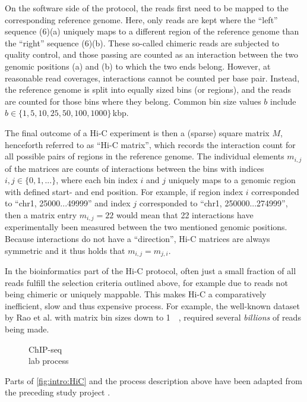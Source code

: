 On the software side of the protocol, the reads first need to be mapped 
to the corresponding reference genome.
Here, only reads are kept where the ``left'' sequence (6)(a)
uniquely maps to a different region of the reference genome than the ``right'' sequence (6)(b).
These so-called chimeric reads are subjected to quality control, and those passing are counted as an interaction
between the two genomic positions (a) and (b) to which the two ends belong.
However, at reasonable read coverages, interactions cannot be counted per base pair. 
Instead, the reference genome is split into equally sized bins (or regions), 
and the reads are counted for those bins where they belong. 
Common bin size values $b$ include $b \in \{1, 5, 10, 25, 50, 100, 1000\}$\,kbp.

The final outcome of a Hi-C experiment is then a (sparse) square matrix $M$, henceforth referred to as ``Hi-C matrix'', 
which records the interaction count for all possible pairs of regions in the reference genome.
The individual elements $m_{i,j}$ of the matrices are counts of interactions between the bins with indices $i,j \in \{0,1,...\}$,
where each bin index $i$ and $j$ uniquely maps to a genomic region with defined start- and end position.
For example, if region index $i$ corresponded to ``chr1, 25000...49999'' and index $j$ corresponded to ``chr1, 250000...274999'',
then a matrix entry $m_{i,j}=22$ would mean that 22 interactions have experimentally been measured between the two mentioned genomic positions.
Because interactions do not have a ``direction'', Hi-C matrices are always symmetric and it thus holds that $m_{i,j} = m_{j,i}$.

In the bioinformatics part of the Hi-C protocol, often just a small fraction of all reads 
fulfill the selection criteria outlined above, for example due to reads not being chimeric or uniquely mappable.
This makes Hi-C a comparatively inefficient, slow and thus expensive process.
For example, the well-known dataset by Rao et al. \cite{Rao2014} with matrix bin sizes down to \SI{1}{\kilo\bp}, required several \emph{billions} of reads being made. 

\begin{wrapfigure}[28]{r}{0.3\textwidth}
 \vspace{-4mm}
 \caption[ChIP-seq lab process]{ChIP-seq\\lab process}
 \label{fig:intro:chipseq1}
\end{wrapfigure}
Parts of \cref{fig:intro:HiC} and the process description above 
have been adapted from the preceding study project \cite{Krauth2020}.



